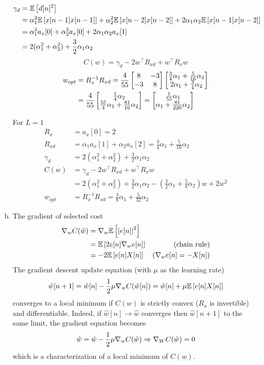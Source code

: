 \begin{enumerate}[(a)]
\begin{align*}
	\gamma_d 
	&= \mathbb{E} \left[ d[n]^2 \right] \\
	&= \alpha_1^2 \mathbb{E} \left[ x[n-1]x[n-1] \right] + \alpha_2^2 \mathbb{E} \left[ x[n-2]x[n-2] \right] + 2\alpha_1 \alpha_2 \mathbb{E} \left[ x[n-1]x[n-2] \right] \\
	&= \alpha_1^2 a_x[0] + \alpha_2^2 a_x[0] + 2\alpha_1 \alpha_2 a_x[1] \\
	&= 2(\alpha_1^2 + \alpha_2^2) + \frac{3}{2} \alpha_1 \alpha_2
\end{align*}
\[C(w) = \gamma_d -2 w^\top R_{xd} + w^\top R_x w\]
\begin{align*}
	w_{opt} 
	&= R_x^{-1}R_{xd} = \frac{4}{55} \begin{bmatrix} 8 & -3 \\ -3 & 8 \end{bmatrix} \begin{bmatrix} \frac{3}{4}\alpha_1 + \frac{5}{16}\alpha_2 \\ 2\alpha_1 + \frac{3}{4}\alpha_2 \end{bmatrix} \\
	&= \frac{4}{55} \begin{bmatrix} \frac{1}{4}\alpha_2 \\ \frac{55}{4}\alpha_1 + \frac{81}{16}\alpha_2 \end{bmatrix} = \begin{bmatrix} \frac{1}{55}\alpha_1 \\ \alpha_1 + \frac{81}{220}\alpha_2 \end{bmatrix}
\end{align*}

For $L = 1$
\begin{align*}
	R_x &= a_x[0] = 2 \\
	R_{xd} &= \alpha_1 a_x[1] + \alpha_2 a_x[2] = \frac{3}{4}\alpha_1 + \frac{5}{16}\alpha_2 \\
	\gamma_d &= 2(\alpha_1^2 + \alpha_2^2) + \frac{3}{2} \alpha_1 \alpha_2 \\
	C(w) &= \gamma_d -2 w^\top R_{xd} + w^\top R_x w \\
		&= 2(\alpha_1^2 + \alpha_2^2) + \frac{3}{2} \alpha_1 \alpha_2 - \left(\frac{3}{2} \alpha_1 + \frac{5}{8} \alpha_2\right) w + 2w^2 \\
	w_{opt} &= R_x^{-1}R_{xd} = \frac{3}{8}\alpha_1 + \frac{5}{32}\alpha_2
\end{align*}

\item The gradient of selected cost
\begin{align*}
	\nabla_w C(\hat{w}) 
	&= \nabla_w \mathbb{E} \left[ \left\lvert e[n] \right\rvert^2 \right] \\
	&= \mathbb{E} \left[ 2 e[n] \nabla_w e[n] \right] & (\text{chain rule})\\
	&= -2\mathbb{E} \left[ e[n]X[n] \right] &(\nabla_w e[n] = -X[n])
\end{align*}
The gradient descent update equation (with $\mu$ as the learning rate)
\[\hat{w}[n+1] = \hat{w}[n] -\frac{1}{2} \mu \nabla_w C(\hat{w}[n]) = \hat{w}[n] + \mu \mathbb{E} \left[ e[n]X[n] \right]\]
converges to a local minimum if $C(w)$ is strictly convex ($R_x$ is invertible) and differentiable. Indeed, if $\hat{w}[n] \rightarrow \hat{w}$ converges then $\hat{w}[n+1]$ to the same limit, the gradient equation becomes
\[\hat{w}= \hat{w} - \frac{1}{2} \mu \nabla_w C(\hat{w}) \Rightarrow \nabla_W C(\hat{w}) = 0\]
which is a characterization of a local minimum of $C(w)$.


\end{enumerate}
